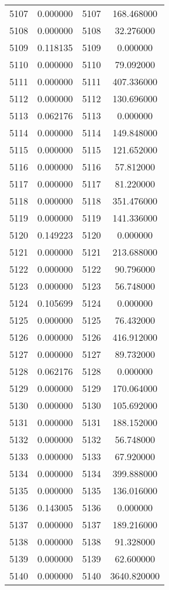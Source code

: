 \documentclass[12pt]{article}
\begin{document}
\begin{longtable}{@{}cccc@{}}
5107 & 0.000000 & 5107 & 168.468000 \\
5108 & 0.000000 & 5108 & 32.276000 \\
5109 & 0.118135 & 5109 & 0.000000 \\
5110 & 0.000000 & 5110 & 79.092000 \\
5111 & 0.000000 & 5111 & 407.336000 \\
5112 & 0.000000 & 5112 & 130.696000 \\
5113 & 0.062176 & 5113 & 0.000000 \\
5114 & 0.000000 & 5114 & 149.848000 \\
5115 & 0.000000 & 5115 & 121.652000 \\
5116 & 0.000000 & 5116 & 57.812000 \\
5117 & 0.000000 & 5117 & 81.220000 \\
5118 & 0.000000 & 5118 & 351.476000 \\
5119 & 0.000000 & 5119 & 141.336000 \\
5120 & 0.149223 & 5120 & 0.000000 \\
5121 & 0.000000 & 5121 & 213.688000 \\
5122 & 0.000000 & 5122 & 90.796000 \\
5123 & 0.000000 & 5123 & 56.748000 \\
5124 & 0.105699 & 5124 & 0.000000 \\
5125 & 0.000000 & 5125 & 76.432000 \\
5126 & 0.000000 & 5126 & 416.912000 \\
5127 & 0.000000 & 5127 & 89.732000 \\
5128 & 0.062176 & 5128 & 0.000000 \\
5129 & 0.000000 & 5129 & 170.064000 \\
5130 & 0.000000 & 5130 & 105.692000 \\
5131 & 0.000000 & 5131 & 188.152000 \\
5132 & 0.000000 & 5132 & 56.748000 \\
5133 & 0.000000 & 5133 & 67.920000 \\
5134 & 0.000000 & 5134 & 399.888000 \\
5135 & 0.000000 & 5135 & 136.016000 \\
5136 & 0.143005 & 5136 & 0.000000 \\
5137 & 0.000000 & 5137 & 189.216000 \\
5138 & 0.000000 & 5138 & 91.328000 \\
5139 & 0.000000 & 5139 & 62.600000 \\
5140 & 0.000000 & 5140 & 3640.820000 \\

\end{longtable}
\end{document}
